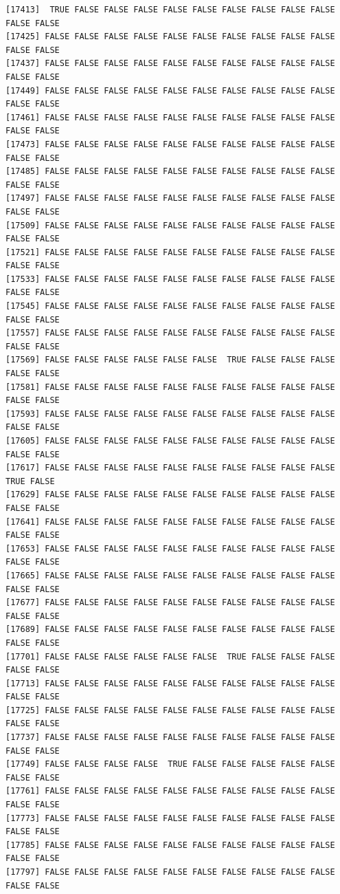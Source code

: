 \documentclass[
  a4paper,
  DIV=11,
  numbers=noendperiod]{scrartcl}
\begin{document}
\begin{verbatim}
[17413]  TRUE FALSE FALSE FALSE FALSE FALSE FALSE FALSE FALSE FALSE FALSE FALSE
[17425] FALSE FALSE FALSE FALSE FALSE FALSE FALSE FALSE FALSE FALSE FALSE FALSE
[17437] FALSE FALSE FALSE FALSE FALSE FALSE FALSE FALSE FALSE FALSE FALSE FALSE
[17449] FALSE FALSE FALSE FALSE FALSE FALSE FALSE FALSE FALSE FALSE FALSE FALSE
[17461] FALSE FALSE FALSE FALSE FALSE FALSE FALSE FALSE FALSE FALSE FALSE FALSE
[17473] FALSE FALSE FALSE FALSE FALSE FALSE FALSE FALSE FALSE FALSE FALSE FALSE
[17485] FALSE FALSE FALSE FALSE FALSE FALSE FALSE FALSE FALSE FALSE FALSE FALSE
[17497] FALSE FALSE FALSE FALSE FALSE FALSE FALSE FALSE FALSE FALSE FALSE FALSE
[17509] FALSE FALSE FALSE FALSE FALSE FALSE FALSE FALSE FALSE FALSE FALSE FALSE
[17521] FALSE FALSE FALSE FALSE FALSE FALSE FALSE FALSE FALSE FALSE FALSE FALSE
[17533] FALSE FALSE FALSE FALSE FALSE FALSE FALSE FALSE FALSE FALSE FALSE FALSE
[17545] FALSE FALSE FALSE FALSE FALSE FALSE FALSE FALSE FALSE FALSE FALSE FALSE
[17557] FALSE FALSE FALSE FALSE FALSE FALSE FALSE FALSE FALSE FALSE FALSE FALSE
[17569] FALSE FALSE FALSE FALSE FALSE FALSE  TRUE FALSE FALSE FALSE FALSE FALSE
[17581] FALSE FALSE FALSE FALSE FALSE FALSE FALSE FALSE FALSE FALSE FALSE FALSE
[17593] FALSE FALSE FALSE FALSE FALSE FALSE FALSE FALSE FALSE FALSE FALSE FALSE
[17605] FALSE FALSE FALSE FALSE FALSE FALSE FALSE FALSE FALSE FALSE FALSE FALSE
[17617] FALSE FALSE FALSE FALSE FALSE FALSE FALSE FALSE FALSE FALSE  TRUE FALSE
[17629] FALSE FALSE FALSE FALSE FALSE FALSE FALSE FALSE FALSE FALSE FALSE FALSE
[17641] FALSE FALSE FALSE FALSE FALSE FALSE FALSE FALSE FALSE FALSE FALSE FALSE
[17653] FALSE FALSE FALSE FALSE FALSE FALSE FALSE FALSE FALSE FALSE FALSE FALSE
[17665] FALSE FALSE FALSE FALSE FALSE FALSE FALSE FALSE FALSE FALSE FALSE FALSE
[17677] FALSE FALSE FALSE FALSE FALSE FALSE FALSE FALSE FALSE FALSE FALSE FALSE
[17689] FALSE FALSE FALSE FALSE FALSE FALSE FALSE FALSE FALSE FALSE FALSE FALSE
[17701] FALSE FALSE FALSE FALSE FALSE FALSE  TRUE FALSE FALSE FALSE FALSE FALSE
[17713] FALSE FALSE FALSE FALSE FALSE FALSE FALSE FALSE FALSE FALSE FALSE FALSE
[17725] FALSE FALSE FALSE FALSE FALSE FALSE FALSE FALSE FALSE FALSE FALSE FALSE
[17737] FALSE FALSE FALSE FALSE FALSE FALSE FALSE FALSE FALSE FALSE FALSE FALSE
[17749] FALSE FALSE FALSE FALSE  TRUE FALSE FALSE FALSE FALSE FALSE FALSE FALSE
[17761] FALSE FALSE FALSE FALSE FALSE FALSE FALSE FALSE FALSE FALSE FALSE FALSE
[17773] FALSE FALSE FALSE FALSE FALSE FALSE FALSE FALSE FALSE FALSE FALSE FALSE
[17785] FALSE FALSE FALSE FALSE FALSE FALSE FALSE FALSE FALSE FALSE FALSE FALSE
[17797] FALSE FALSE FALSE FALSE FALSE FALSE FALSE FALSE FALSE FALSE FALSE FALSE

\end{verbatim}
\end{document}

